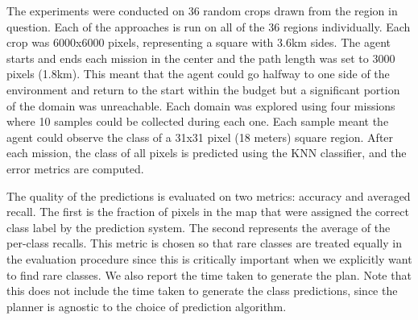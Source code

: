 The experiments were conducted on 36 random crops drawn from the region in question. Each of the approaches is run on all of the 36 regions individually. Each crop was 6000x6000 pixels, representing a square with 3.6km sides. The agent starts and ends each mission in the center and the path length was set to 3000 pixels (1.8km). This meant that the agent could go halfway to one side of the environment and return to the start within the budget but a significant portion of the domain was unreachable. Each domain was explored using four missions where 10 samples could be collected during each one. Each sample meant the agent could observe the class of a 31x31 pixel (18 meters) square region. After each mission, the class of all pixels is predicted using the KNN classifier, and the error metrics are computed.

The quality of the predictions is evaluated on two metrics: accuracy and averaged recall. The first is the fraction of pixels in the map that were assigned the correct class label by the prediction system. The second represents the average of the per-class recalls. This metric is chosen so that rare classes are treated equally in the evaluation procedure since this is critically important when we explicitly want to find rare classes. We also report the time taken to generate the plan. Note that this does not include the time taken to generate the class predictions, since the planner is agnostic to the choice of prediction algorithm.


